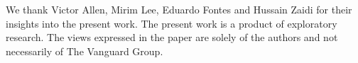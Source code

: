 \documentclass[sigconf]{acmart}
\begin{document}


\begin{acks}
We thank Victor Allen, Mirim Lee, Eduardo Fontes and Hussain Zaidi for their insights into the present work. The present work is a product of exploratory research. The views expressed in the paper are solely of the authors and not necessarily of The Vanguard Group.
\end{acks}






\end{document}
